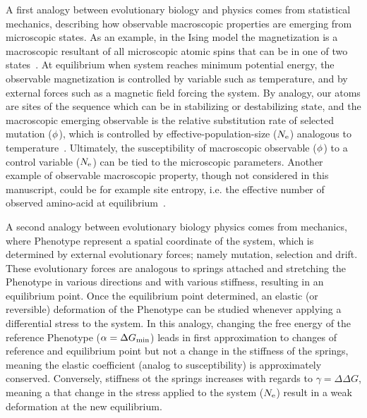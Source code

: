 A first analogy between evolutionary biology and physics comes from statistical mechanics, describing how observable macroscopic properties are emerging from microscopic states.
As an example, in the Ising model the magnetization is a macroscopic resultant of all microscopic atomic spins that can be in one of two states~\citep{Brush1967}.
At equilibrium when system reaches minimum potential energy, the observable magnetization is controlled by variable such as temperature, and by external forces such as a magnetic field forcing the system.
By analogy, our atoms are sites of the sequence which can be in stabilizing or destabilizing state, and the macroscopic emerging observable is the relative \gls{substitution} rate of selected mutation ($\phi$), which is controlled by \gls{effective-population-size} ($N_{\mathrm{e}}$) analogous to temperature~\citep{Sella2005}.
Ultimately, the susceptibility of macroscopic observable ($\phi$) to a control variable ($N_{\mathrm{e}}$) can be tied to the microscopic parameters.
Another example of observable macroscopic property, though not considered in this manuscript, could be for example site entropy, i.e. the effective number of observed amino-acid at equilibrium~\citep{Goldstein2016, Jimenez2018, Jiang2018}.

A second analogy between evolutionary biology physics comes from mechanics, where \gls{Phenotype} represent a spatial coordinate of the system, which is determined by external evolutionary forces; namely mutation, selection and drift.
These evolutionary forces are analogous to springs attached and stretching the \gls{Phenotype} in various directions and with various stiffness, resulting in an equilibrium point.
Once the equilibrium point determined, an elastic (or reversible) deformation of the \gls{Phenotype} can be studied whenever applying a differential stress to the system.
In this analogy, changing the free energy of the reference \gls{Phenotype} ($\alpha = \Delta G_{\text{min}}$) leads in first approximation to changes of reference and equilibrium point but not a change in the stiffness of the springs, meaning the elastic coefficient (analog to susceptibility) is approximately conserved.
Conversely, stiffness ot the springs increases with regards to $\gamma = \Delta \Delta G$, meaning a that change in the stress applied to the system ($N_{\mathrm{e}}$) result in a weak deformation at the new equilibrium.

